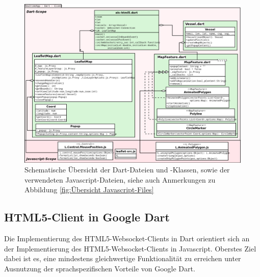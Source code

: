 \begin{figure}[H]
  \centering
  \includegraphics[width=6.2in]{images/Dart-DateienUndKlassen.png}
  \caption[Übersicht Dart-Files]{Schematische Übersicht der Dart-Dateien und -Klassen, sowie der verwendeten Javascript-Dateien, siehe auch Anmerkungen zu Abbildung \ref{fig:Übersicht Javascript-Files}}
  \label{fig:Übersicht Dart-Files}
\end{figure}


\subsection{HTML5-Client in Google Dart}\label{HTML5-Client in Dart}
Die Implementierung des HTML5-Websocket-Clients in Dart orientiert sich an der Implementierung des HTML5-Websocket-Clients in Javascript. Oberstes Ziel dabei ist es, eine mindestens gleichwertige Funktionalität zu erreichen unter Ausnutzung der sprachspezifischen Vorteile von Google Dart. \\

